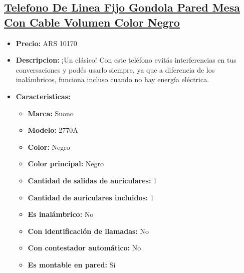 \documentclass{article}
\begin{document}
    
    \begin{adjustwidth}{2em}{}

    \subsection{\underline{\href{https://www.mercadolibre.com.ar/telefono-de-linea-fijo-gondola-pared-mesa-con-cable-volumen-color-negro/p/MLA19830945}{Telefono De Linea Fijo Gondola Pared Mesa Con Cable Volumen Color Negro}}}
    \begin{itemize}
        \item \textbf{Precio:} ARS 10170
        \item \textbf{Descripcion:} ¡Un clásico! Con este teléfono evitás interferencias en tus conversaciones y podés usarlo siempre, ya que a diferencia de los inalámbricos, funciona incluso cuando no hay energía eléctrica.
        \item \textbf{Caracteristicas:} 
        \begin{itemize}
            \item \textbf {Marca:} Suono
    \item \textbf {Modelo:} 2770A
    \item \textbf {Color:} Negro
    \item \textbf {Color principal:} Negro
    \item \textbf {Cantidad de salidas de auriculares:} 1
    \item \textbf {Cantidad de auriculares incluidos:} 1
    \item \textbf {Es inalámbrico:} No
    \item \textbf {Con identificación de llamadas:} No
    \item \textbf {Con contestador automático:} No
    \item \textbf {Es montable en pared:} Sí
        \end{itemize}
    \end{itemize}

    \vspace{1\baselineskip} %
    \end{adjustwidth}
\end{document}
